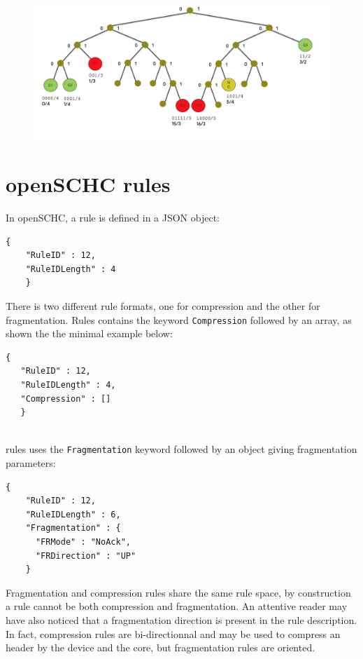 \begin{figure}[tbp]
\centerline{\includegraphics[width=1\columnwidth]{Pictures/binary-rule.png}}
\label{fig-base64}
\end{figure}

\section{openSCHC rules}

In openSCHC, a rule is defined in a JSON object:

\begin{lstlisting}[backgroundcolor=\color{yellow}]
    {
    "RuleID" : 12,
    "RuleIDLength" : 4
    }
\end{lstlisting}

There is two different rule formats, one for compression and the other for fragmentation.  Rules contains the keyword \texttt{Compression} followed by an array, as shown the the minimal example below: 

\begin{lstlisting}[backgroundcolor=\color{yellow}]
   {
   "RuleID" : 12,
   "RuleIDLength" : 4,
   "Compression" : []
   }
   
\end{lstlisting}

   
 rules uses the \texttt{Fragmentation} keyword followed by an object giving fragmentation parameters:

\begin{lstlisting}[backgroundcolor=\color{yellow}]
    {
    "RuleID" : 12,
    "RuleIDLength" : 6,
    "Fragmentation" : {
      "FRMode" : "NoAck",
      "FRDirection" : "UP"
    }
\end{lstlisting}

Fragmentation and compression rules share the same rule space, by construction a rule cannot be both compression and fragmentation. 
An attentive reader may have also noticed that a fragmentation direction is present in the rule description. 
In fact, compression rules are bi-directionnal and may be used to compress an header by the device and the core, but fragmentation rules are oriented.  

